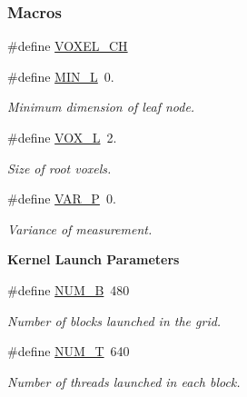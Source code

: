 \subsubsection*{Macros}
\begin{DoxyCompactItemize}
\item 
\#define \hyperlink{Voxel_8cuh_aca76098e63473a0423c740cd04ec72b8}{V\+O\+X\+E\+L\+\_\+\+CH}
\item 
\#define \hyperlink{Voxel_8cuh_a29d8f4bb35f9fa62e1d680bc6ab1f4f1}{M\+I\+N\+\_\+L}~0.
\begin{DoxyCompactList}\small\item\em Minimum dimension of leaf node. \end{DoxyCompactList}\item 
\#define \hyperlink{Voxel_8cuh_a3c1c8b966e30fa8ca2de07abe3b3d74a}{V\+O\+X\+\_\+L}~2.
\begin{DoxyCompactList}\small\item\em Size of root voxels. \end{DoxyCompactList}\item 
\#define \hyperlink{Voxel_8cuh_ae1cd6283839fc3aebf9bccbd1044a365}{V\+A\+R\+\_\+P}~0.
\begin{DoxyCompactList}\small\item\em Variance of measurement. \end{DoxyCompactList}\end{DoxyCompactItemize}
\begin{Indent}{\bf Kernel Launch Parameters}\par
\begin{DoxyCompactItemize}
\item 
\#define \hyperlink{Voxel_8cuh_a9f984157d0b56c37dfb4bd1a16f1e8ab}{N\+U\+M\+\_\+B}~480
\begin{DoxyCompactList}\small\item\em Number of blocks launched in the grid. \end{DoxyCompactList}\item 
\#define \hyperlink{Voxel_8cuh_ad8ba90b2d681fcfbc6cde44271ad6519}{N\+U\+M\+\_\+T}~640
\begin{DoxyCompactList}\small\item\em Number of threads launched in each block. \end{DoxyCompactList}\end{DoxyCompactItemize}
\end{Indent}
